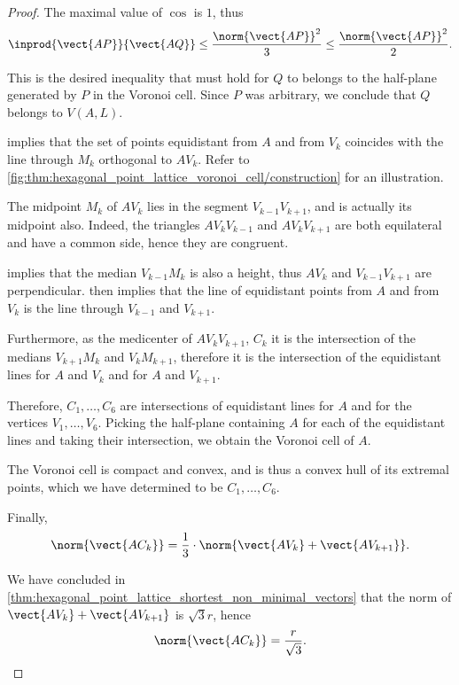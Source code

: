 \begin{proof}
  The maximal value of \( \cos \) is \( 1 \), thus
  \begin{equation*}
    \inprod {\vect{AP}} {\vect{AQ}} \leq \frac {\norm{\vect{AP}}^2} 3 \leq \frac {\norm{\vect{AP}}^2} 2.
  \end{equation*}

  This is the desired inequality that must hold for \( Q \) to belongs to the half-plane generated by \( P \) in the Voronoi cell. Since \( P \) was arbitrary, we conclude that \( Q \) belongs to \( V(A, L) \).

    implies that the set of points equidistant from \( A \) and from \( V_k \) coincides with the line through \( M_k \) orthogonal to \( A V_k \). Refer to \cref{fig:thm:hexagonal_point_lattice_voronoi_cell/construction} for an illustration.

  The midpoint \( M_k \) of \( A V_k \) lies in the segment \( V_{k-1} V_{k+1} \), and is actually its midpoint also. Indeed, the triangles \( A V_k V_{k-1} \) and \( A V_k V_{k+1} \) are both equilateral and have a common side, hence they are congruent.

   implies that the median \( V_{k-1} M_k \) is also a height, thus \( AV_k \) and \( V_{k-1} V_{k+1} \) are perpendicular.  then implies that the line of equidistant points from \( A \) and from \( V_k \) is the line through \( V_{k-1} \) and \( V_{k+1} \).

  Furthermore, as the medicenter of \( A V_k V_{k+1} \), \( C_k \) it is the intersection of the medians \( V_{k+1} M_k \) and \( V_k M_{k+1} \), therefore it is the intersection of the equidistant lines for \( A \) and \( V_k \) and for \( A \) and \( V_{k+1} \).

  Therefore, \( C_1, \ldots, C_6 \) are intersections of equidistant lines for \( A \) and for the vertices \( V_1, \ldots, V_6 \). Picking the half-plane containing \( A \) for each of the equidistant lines and taking their intersection, we obtain the Voronoi cell of \( A \).

  The Voronoi cell is compact and convex, and is thus a convex hull of its extremal points, which we have determined to be \( C_1, \ldots, C_6 \).

   Finally,
  \begin{equation*}
    \norm{\vect{AC_k}}
    =
    \frac 1 3 \cdot \norm{\vect{AV_k} + \vect{AV_{k+1}}}.
  \end{equation*}

  We have concluded in \cref{thm:hexagonal_point_lattice_shortest_non_minimal_vectors} that the norm of \( \vect{AV_k} + \vect{AV_{k+1}} \) is \( \sqrt 3 r \), hence
  \begin{equation*}
    \norm{\vect{AC_k}} = \frac r {\sqrt 3}.
  \end{equation*}
\end{proof}

